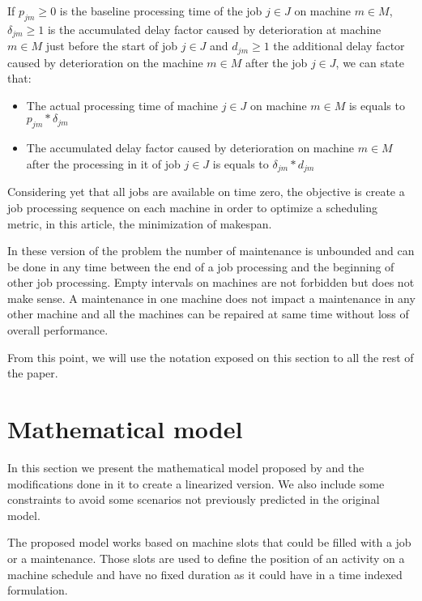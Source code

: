 \documentclass[a4paper,11pt]{article}
\begin{document}
If $p_{jm} \geq 0 $ is the baseline processing time of the job $j \in J$ on machine $m \in M$, $\delta_{jm} \geq 1$ is the accumulated delay factor caused by deterioration at machine $m \in M$ just before the start of job $j \in J$ and $d_{jm} \geq 1$ the additional delay factor caused by deterioration on the machine $m \in M$ after the job $j \in J$, we can state that:

\begin{itemize}
\item{  The actual processing time of machine $j \in J$ on machine $m \in M$ is equals to $p_{jm}*\delta_{jm}$ }

\item{ The accumulated delay factor caused by deterioration on machine $m \in M$ after the processing in it of job $j \in J$ is equals to $\delta_{jm}*d_{jm}$}
\end{itemize}

Considering yet that all jobs are available on time zero, the objective is create a job processing sequence on each machine in order to optimize a scheduling metric, in this article, the minimization of makespan. 

In these version of the problem the number of maintenance is unbounded and can be done in any time between the end of a job processing and the beginning of other job processing. Empty intervals on machines are not forbidden but does not make sense. A maintenance in one machine does not impact a maintenance in any other machine and all the machines can be repaired at same time without loss of overall performance. 

From this point, we will use the notation exposed on this section to all the rest of the paper. 


\section{Mathematical model}

In this section we present the mathematical model proposed by \citep{ruiz2017makespan} and the modifications done in it to create a linearized version. We also include some constraints to avoid some scenarios not previously predicted in the original model.

The proposed model works based on machine slots that could be filled with a job or a maintenance. Those slots are used to define the position of an activity on a machine schedule and have no fixed duration as it could have in a time indexed formulation. 
\end{document}
